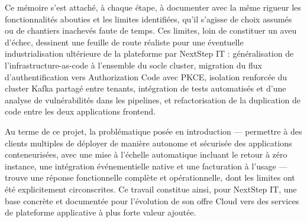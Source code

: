 Ce mémoire s'est attaché, à chaque étape, à documenter avec la même rigueur les fonctionnalités abouties et les limites identifiées, qu'il s'agisse de choix assumés ou de chantiers inachevés faute de temps. Ces limites, loin de constituer un aveu d'échec, dessinent une feuille de route réaliste pour une éventuelle industrialisation ultérieure de la plateforme par NextStep IT : généralisation de l'infrastructure-as-code à l'ensemble du socle cluster, migration du flux d'authentification vers Authorization Code avec PKCE, isolation renforcée du cluster Kafka partagé entre tenants, intégration de tests automatisés et d'une analyse de vulnérabilités dans les pipelines, et refactorisation de la duplication de code entre les deux applications frontend.

Au terme de ce projet, la problématique posée en introduction — permettre à des clients multiples de déployer de manière autonome et sécurisée des applications conteneurisées, avec une mise à l'échelle automatique incluant le retour à zéro instance, une intégration événementielle native et une facturation à l'usage — trouve une réponse fonctionnelle complète et opérationnelle, dont les limites ont été explicitement circonscrites. Ce travail constitue ainsi, pour NextStep IT, une base concrète et documentée pour l'évolution de son offre Cloud vers des services de plateforme applicative à plus forte valeur ajoutée.
